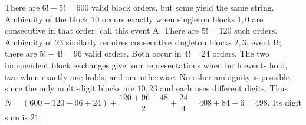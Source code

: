 There are $6!-5!=600$ valid block orders, but some yield the same string. Ambiguity of the block $10$ occurs exactly when singleton blocks $1,0$ are consecutive in that order; call this event A. There are $5!=120$ such orders. Ambiguity of $23$ similarly requires consecutive singleton blocks $2,3$, event B; there are $5!-4!=96$ valid orders. Both occur in $4!=24$ orders. The two independent block exchanges give four representations when both events hold, two when exactly one holds, and one otherwise. No other ambiguity is possible, since the only multi-digit blocks are $10,23$ and each uses different digits. Thus $N=(600-120-96+24)+\dfrac{120+96-48}{2}+\dfrac{24}{4}=408+84+6=498$. Its digit sum is $\boxed{21}$.
